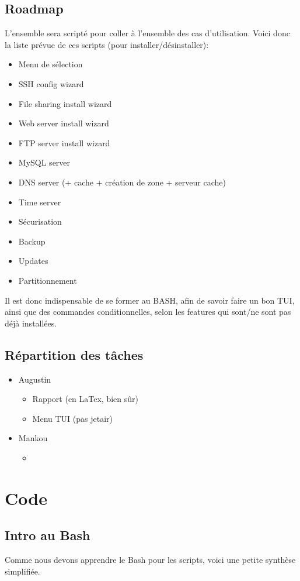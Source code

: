 \documentclass{article}
\begin{document}
	\subsection{Roadmap}
	L'ensemble sera scripté pour coller à l'ensemble des cas d'utilisation. Voici donc la liste prévue de ces scripts (pour installer/désinstaller):
			\begin{itemize}
				\item Menu de sélection
				\item SSH config wizard
				\item File sharing install wizard
				\item Web server install wizard
				\item FTP server install wizard
				\item MySQL server 
				\item DNS server (+ cache + création de zone + serveur cache)
				\item Time server
				\item Sécurisation
				\item Backup
				\item Updates
				\item Partitionnement
		\end{itemize}
		Il est donc indispensable de se former au BASH, afin de savoir faire un bon TUI, ainsi que des commandes conditionnelles, selon les features qui sont/ne sont pas déjà installées.
	\subsection{Répartition des tâches}
	\begin{itemize}
		\item Augustin
		\begin{itemize}
			\item Rapport (en LaTex, bien sûr)
			\item Menu TUI (pas jetair)
		\end{itemize}
		\item Mankou
		\begin{itemize}
			\item 
		\end{itemize}
	\end{itemize}
	\section{Code}
	\subsection{Intro au Bash}
	Comme nous devons apprendre le Bash pour les scripts, voici une petite synthèse simplifiée.
	
\end{document}

